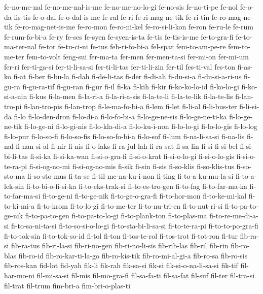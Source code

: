{fe-no-me-nal fe-no-me-nal-is-me fe-no-me-no-lo-gi fe-no-sis fe-no-ti-pe
fe-nol fe-o-da-lis-tis fe-o-dal fe-o-dal-is-me fe-ral fe-ri
fe-ri-mag-ne-tik fe-ri-tin fe-ro-mag-ne-tik fe-ro-mag-net-is-me fe-ro-mon
fe-ro-ni-kel fe-ro-si-li-kon fe-ron fe-ru-le fe-rum fe-rum-fo-bi-a fe-ry
fe-ses fe-syen fe-syen-is-ta fe-tis fe-tis-is-me fe-to-gra-fi
fe-to-ma-ter-nal fe-tor fe-tu-ci-ni fe-tus feb-ri-fo-bi-a fel-spar
fem-to-am-pe-re fem-to-me-ter fem-to-volt feng-sui fer-ma-ta fer-men
fer-men-ta-si fer-mi-on fer-mi-um fer-ri fer-ti-ga-si fer-ti-li-sa-si
fer-ti-li-tas fer-ti-li-zin fer-til fes-ti-val fes-ton fi-as-ko fi-at
fi-ber fi-bu-la fi-dah fi-de-li-tas fi-der fi-di-ah fi-du-si-a
fi-du-si-a-ri-us fi-gu-ra fi-gu-ra-tif fi-gu-ran fi-gur fi-il fi-ka fi-kih
fi-kir fi-ko-ko-lo-id fi-ko-lo-gi fi-ko-si-a-nin fi-kus fi-la-men
fi-la-ri-a fi-la-ri-a-sis fi-la-te-li fi-la-te-lik fi-la-te-lis
fi-lan-tro-pi fi-lan-tro-pis fi-lan-trop fi-le-ma-fo-bi-a fi-lem fi-let
fi-li-al fi-li-bus-ter fi-li-si-da fi-lo fi-lo-den-dron fi-lo-di-a
fi-lo-fo-bi-a fi-lo-ge-ne-sis fi-lo-ge-ne-ti-ka fi-lo-ge-ne-tik
fi-lo-ge-ni fi-lo-gi-nis fi-lo-kla-di-a fi-lo-ku-i-non fi-lo-lo-gi
fi-lo-lo-gis fi-lo-log fi-lo-pur fi-lo-so-fi fi-lo-so-fis fi-lo-so-fo-bi-a
fi-lo-sof fi-lum fi-na-li-sa-si fi-na-lis fi-nal fi-nan-si-al fi-nir
fi-nis fi-o-laks fi-ra-jul-lah fi-ra-sat fi-sa-lin fi-si fi-si-bel
fi-si-bi-li-tas fi-si-ka fi-si-ka-wan fi-si-o-gra-fi fi-si-o-krat
fi-si-o-lo-gi fi-si-o-lo-gis fi-si-o-te-ra-pi fi-si-og-no-mi
fi-si-og-no-mis fi-sik fi-sin fi-sis fi-so-klis fi-so-klis-tus
fi-so-sto-ma fi-so-sto-mus fi-ta-se fi-til-me-na-ku-i-non fi-ting
fi-to-a-ku-mu-la-si fi-to-a-lek-sin fi-to-bi-o-fi-si-ka fi-to-eks-trak-si
fi-to-es-tro-gen fi-to-fag fi-to-far-ma-ka fi-to-far-ma-si fi-to-ge-ni
fi-to-ge-nik fi-to-ge-o-gra-fi fi-to-hor-mon fi-to-ke-mi-kal fi-to-ki-mi-a
fi-to-krom fi-to-lo-gi fi-to-me-ter fi-to-nu-tri-en fi-to-nut-ri-si
fi-to-pa-to-ge-nik fi-to-pa-to-gen fi-to-pa-to-lo-gi fi-to-plank-ton
fi-to-plas-ma fi-to-re-me-di-a-si fi-to-sa-ni-ta-si fi-to-so-si-o-lo-gi
fi-to-sta-bi-li-sa-si fi-to-te-ra-pi fi-to-to-po-gra-fi fi-to-tok-sin
fi-to-tok-so-id fi-tol fi-ton fi-tos-te-rol fi-tos-trot fi-tot-ron fi-tur
fib-ra-si fib-ra-tus fib-ri-la-si fib-ri-no-gen fib-ri-no-li-sis
fib-rib-las fib-ril fib-rin fib-ro-blas fib-ro-id fib-ro-kar-ti-la-go
fib-ro-kis-tik fib-ro-mi-al-gi-a fib-ro-sa fib-ro-sis fib-ros-kan fid-lot
fid-yah fik-li fik-rah fik-sa-si fik-si fik-si-o-na-li-sa-si fik-tif
fil-har-mo-ni fil-mi-sa-si fil-mis fil-mo-gra-fi fil-sa-fa-ti fil-sa-fat
fil-suf fil-ter fil-tra-si fil-trat fil-trum fim-bri-a fim-bri-o-plas-ti
}

